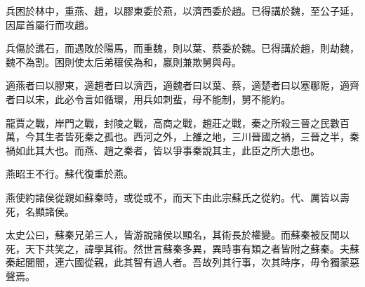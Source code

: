 兵困於林中，重燕、趙，以膠東委於燕，以濟西委於趙。已得講於魏，至公子延，因犀首屬行而攻趙。

兵傷於譙石，而遇敗於陽馬，而重魏，則以葉、蔡委於魏。已得講於趙，則劫魏，魏不為割。困則使太后弟穰侯為和，嬴則兼欺舅與母。

適燕者曰以膠東，適趙者曰以濟西，適魏者曰以葉、蔡，適楚者曰以塞鄳阸，適齊者曰以宋，此必令言如循環，用兵如刺蜚，母不能制，舅不能約。

龍賈之戰，岸門之戰，封陵之戰，高商之戰，趙莊之戰，秦之所殺三晉之民數百萬，今其生者皆死秦之孤也。西河之外，上雒之地，三川晉國之禍，三晉之半，秦禍如此其大也。而燕、趙之秦者，皆以爭事秦說其主，此臣之所大患也。

燕昭王不行。蘇代復重於燕。

燕使約諸侯從親如蘇秦時，或從或不，而天下由此宗蘇氏之從約。代、厲皆以壽死，名顯諸侯。

太史公曰，蘇秦兄弟三人，皆游說諸侯以顯名，其術長於權變。而蘇秦被反閒以死，天下共笑之，諱學其術。然世言蘇秦多異，異時事有類之者皆附之蘇秦。夫蘇秦起閭閻，連六國從親，此其智有過人者。吾故列其行事，次其時序，毋令獨蒙惡聲焉。